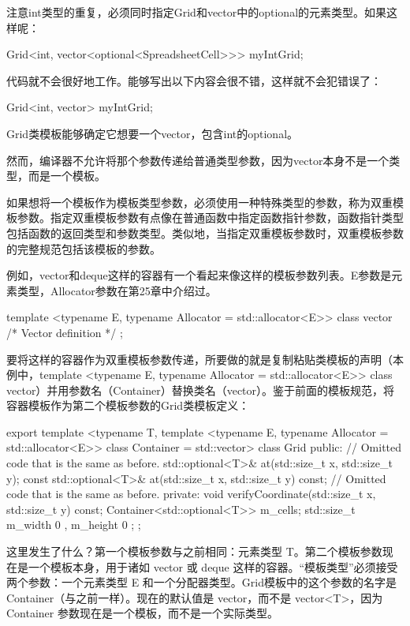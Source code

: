 注意int类型的重复，必须同时指定Grid和vector中的optional的元素类型。如果这样呢：

\begin{cpp}
Grid<int, vector<optional<SpreadsheetCell>>> myIntGrid;
\end{cpp}

代码就不会很好地工作。能够写出以下内容会很不错，这样就不会犯错误了：

\begin{cpp}
Grid<int, vector> myIntGrid;
\end{cpp}

Grid类模板能够确定它想要一个vector，包含int的optional。

然而，编译器不允许将那个参数传递给普通类型参数，因为vector本身不是一个类型，而是一个模板。

如果想将一个模板作为模板类型参数，必须使用一种特殊类型的参数，称为双重模板参数。指定双重模板参数有点像在普通函数中指定函数指针参数，函数指针类型包括函数的返回类型和参数类型。类似地，当指定双重模板参数时，双重模板参数的完整规范包括该模板的参数。

例如，vector和deque这样的容器有一个看起来像这样的模板参数列表。E参数是元素类型，Allocator参数在第25章中介绍过。

\begin{cpp}
template <typename E, typename Allocator = std::allocator<E>>
class vector { /* Vector definition */ };
\end{cpp}

要将这样的容器作为双重模板参数传递，所要做的就是复制粘贴类模板的声明（本例中，template <typename E, typename Allocator = std::allocator<E>{}> class vector）并用参数名（Container）替换类名（vector）。鉴于前面的模板规范，将容器模板作为第二个模板参数的Grid类模板定义：

\begin{cpp}
export template <typename T,
    template <typename E, typename Allocator = std::allocator<E>> class Container
        = std::vector>
class Grid
{
    public:
        // Omitted code that is the same as before.
        std::optional<T>& at(std::size_t x, std::size_t y);
        const std::optional<T>& at(std::size_t x, std::size_t y) const;
        // Omitted code that is the same as before.
    private:
        void verifyCoordinate(std::size_t x, std::size_t y) const;
        Container<std::optional<T>> m_cells;
        std::size_t m_width { 0 }, m_height { 0 };
};
\end{cpp}

这里发生了什么？第一个模板参数与之前相同：元素类型 T。第二个模板参数现在是一个模板本身，用于诸如 vector 或 deque 这样的容器。“模板类型”必须接受两个参数：一个元素类型 E 和一个分配器类型。Grid模板中的这个参数的名字是 Container（与之前一样）。现在的默认值是 vector，而不是 vector<T>，因为 Container 参数现在是一个模板，而不是一个实际类型。

